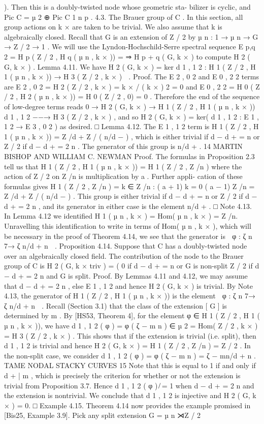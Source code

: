 \documentclass{article}
\begin{document}
). Then this is a doubly-twisted node whose geometric sta- bilizer is cyclic, and Pic C = µ 2 ⊕ Pic C 1 n p . 4.3. The Brauer group of C . In this section, all group actions on k × are taken to be trivial. We also assume that k is algebraically closed. Recall that G is an extension of Z / 2 by µ n : 1 → µ n → G → Z / 2 → 1 . We will use the Lyndon-Hochschild-Serre spectral sequence E p,q 2 = H p ( Z / 2 , H q ( µ n , k × )) = ⇒ H p + q ( G, k × ) to compute H 2 ( G, k × ) . Lemma 4.11. We have H 2 ( G, k × ) = ker   d 1 , 1 2 : H 1 ( Z / 2 , H 1 ( µ n , k × )) → H 3 ( Z / 2 , k × )  . Proof. The E 2 , 0 2 and E 0 , 2 2 terms are E 2 , 0 2 = H 2 ( Z / 2 , k × ) = k × / ( k × ) 2 = 0 and E 0 , 2 2 = H 0 ( Z / 2 , H 2 ( µ n , k × )) = H 0 ( Z / 2 , 0) = 0 . Therefore the end of the sequence of low-degree terms reads 0 → H 2 ( G, k × ) → H 1 ( Z / 2 , H 1 ( µ n , k × )) d 1 , 1 2 −−→ H 3 ( Z / 2 , k × ) , and so H 2 ( G, k × ) = ker( d 1 , 1 2 : E 1 , 1 2 → E 3 , 0 2 ) as desired. □ Lemma 4.12. The E 1 , 1 2 term is H 1 ( Z / 2 , H 1 ( µ n , k × )) = Z /d + Z / ( n/d − ) , which is either trivial if d − d + = n or Z / 2 if d − d + = 2 n . The generator of this group is n/d + . 14 MARTIN BISHOP AND WILLIAM C. NEWMAN Proof. The formulas in Proposition 2.3 tell us that H 1 ( Z / 2 , H 1 ( µ n , k × )) = H 1 ( Z / 2 , Z /n ) where the action of Z / 2 on Z /n is multiplication by a . Further appli- cation of these formulas gives H 1 ( Z / 2 , Z /n ) = { k ∈ Z /n : ( a + 1) k = 0 } ( a − 1) Z /n = Z /d + Z / ( n/d − ) . This group is either trivial if d − d + = n or Z / 2 if d − d + = 2 n , and its generator in either case is the element n/d + . □ Note 4.13. In Lemma 4.12 we identified H 1 ( µ n , k × ) = Hom( µ n , k × ) = Z /n. Unravelling this identification to write in terms of Hom( µ n , k × ), which will be necessary in the proof of Theorem 4.14, we see that the generator is  φ : ζ n 7→ ζ n/d + n  . Proposition 4.14. Suppose that C has a doubly-twisted node over an algebraically closed field. The contribution of the node to the Brauer group of C is H 2 ( G, k × triv ) = ( 0 if d − d + = n or G is non-split Z / 2 if d − d + = 2 n and G is split. Proof. By Lemmas 4.11 and 4.12, we may assume that d − d + = 2 n , else E 1 , 1 2 and hence H 2 ( G, k × ) is trivial. By Note 4.13, the generator of H 1 ( Z / 2 , H 1 ( µ n , k × )) is the element  φ : ζ n 7→ ζ n/d + n  . Recall (Section 3.1) that the class of the extension [ G ] is determined by m . By [HS53, Theorem 4], for the element φ ∈ H 1 ( Z / 2 , H 1 ( µ n , k × )), we have d 1 , 1 2 ( φ ) = φ ( ζ − m n ) ∈ µ 2 = Hom( Z / 2 , k × ) = H 3 ( Z / 2 , k × ) . This shows that if the extension is trivial (i.e. split), then d 1 , 1 2 is trivial and hence H 2 ( G, k × ) = H 1 ( Z / 2 , Z /n ) = Z / 2 . In the non-split case, we consider d 1 , 1 2 ( φ ) = φ ( ζ − m n ) = ζ − mn/d + n . TAME NODAL STACKY CURVES 15 Note that this is equal to 1 if and only if d + | m , which is precisely the criterion for whether or not the extension is trivial from Proposition 3.7. Hence d 1 , 1 2 ( φ ) ̸ = 1 when d − d + = 2 n and the extension is nontrivial. We conclude that d 1 , 1 2 is injective and H 2 ( G, k × ) = 0. □ Example 4.15. Theorem 4.14 now provides the example promised in [Bis25, Example 3.9]. Pick any split extension G = µ n ⋊Z / 2 
\end{document}
